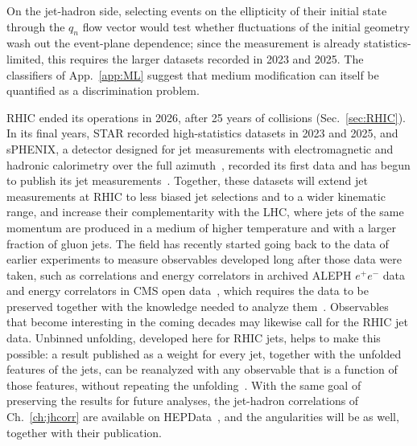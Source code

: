 On the jet-hadron side, selecting events on the ellipticity of their initial state through the \(q_n\) flow vector would test whether fluctuations of the initial geometry wash out the event-plane dependence; since the measurement is already statistics-limited, this requires the larger \AuAu datasets recorded in 2023 and 2025.
%
The classifiers of App.~\ref{app:ML} suggest that medium modification can itself be quantified as a discrimination problem.

RHIC ended its operations in 2026, after 25 years of collisions (Sec.~\ref{sec:RHIC}).
%
In its final years, STAR recorded high-statistics \AuAu datasets in 2023 and 2025, and sPHENIX, a detector designed for jet measurements with electromagnetic and hadronic calorimetry over the full azimuth~\cite{PHENIX:2015siv}, recorded its first data and has begun to publish its jet measurements~\cite{sPHENIX:2026jgh}.
%
Together, these datasets will extend jet measurements at RHIC to less biased jet selections and to a wider kinematic range, and increase their complementarity with the LHC, where jets of the same momentum are produced in a medium of higher temperature and with a larger fraction of gluon jets.
%
%
The field has recently started going back to the data of earlier experiments to measure observables developed long after those data were taken, such as correlations and energy correlators in archived ALEPH \(e^+e^-\) data~\cite{Electron-PositronAlliance:2019cpi,Bossi:2024qeu} and energy correlators in CMS open data~\cite{Komiske:2022enw}, which requires the data to be preserved together with the knowledge needed to analyze them~\cite{DPHEP:2023blx}.
%
Observables that become interesting in the coming decades may likewise call for the RHIC jet data.
%
Unbinned unfolding, developed here for RHIC jets, helps to make this possible: a result published as a weight for every jet, together with the unfolded features of the jets, can be reanalyzed with any observable that is a function of those features, without repeating the unfolding~\cite{Canelli_2026}.
%
With the same goal of preserving the results for future analyses, the jet-hadron correlations of Ch.~\ref{ch:jhcorr} are available on HEPData~\cite{HEPData:ins2735142}, and the \pp angularities will be as well, together with their publication.
